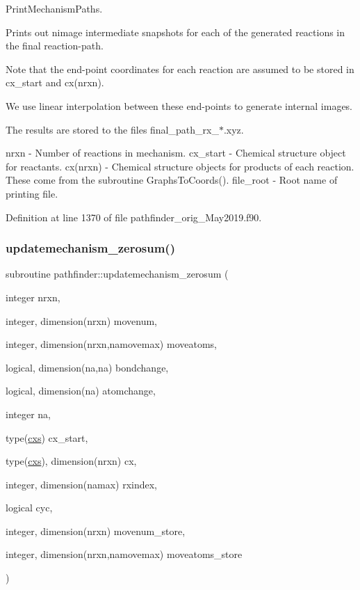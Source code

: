 Print\+Mechanism\+Paths. 

Prints out nimage intermediate snapshots for each of the generated reactions in the final reaction-\/path.

Note that the end-\/point coordinates for each reaction are assumed to be stored in cx\+\_\+start and cx(nrxn).

We use linear interpolation between these end-\/points to generate internal images.

The results are stored to the files final\+\_\+path\+\_\+rx\+\_\+$\ast$.xyz.

nrxn -\/ Number of reactions in mechanism. cx\+\_\+start -\/ Chemical structure object for reactants. cx(nrxn) -\/ Chemical structure objects for products of each reaction. These come from the subroutine Graphs\+To\+Coords(). file\+\_\+root -\/ Root name of printing file. 

Definition at line 1370 of file pathfinder\+\_\+orig\+\_\+\+May2019.\+f90.

\mbox{\label{namespacepathfinder_a25b775f7df0cf4f7bcdbfc0a97dcbbc4}} 
\subsubsection{\texorpdfstring{updatemechanism\+\_\+zerosum()}{updatemechanism\_zerosum()}}
{\footnotesize\ttfamily subroutine pathfinder\+::updatemechanism\+\_\+zerosum (\begin{DoxyParamCaption}\item[{integer}]{nrxn,  }\item[{integer, dimension(nrxn)}]{movenum,  }\item[{integer, dimension(nrxn,namovemax)}]{moveatoms,  }\item[{logical, dimension(na,na)}]{bondchange,  }\item[{logical, dimension(na)}]{atomchange,  }\item[{integer}]{na,  }\item[{type(\mbox{\hyperlink{structchemstr_1_1cxs}{cxs}})}]{cx\+\_\+start,  }\item[{type(\mbox{\hyperlink{structchemstr_1_1cxs}{cxs}}), dimension(nrxn)}]{cx,  }\item[{integer, dimension(namax)}]{rxindex,  }\item[{logical}]{cyc,  }\item[{integer, dimension(nrxn)}]{movenum\+\_\+store,  }\item[{integer, dimension(nrxn,namovemax)}]{moveatoms\+\_\+store }\end{DoxyParamCaption})}



